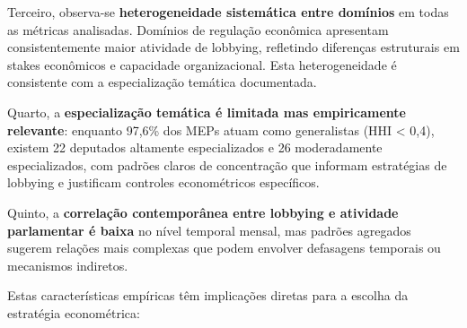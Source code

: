 Terceiro, observa-se \textbf{heterogeneidade sistemática entre domínios} em todas as métricas analisadas. Domínios de regulação econômica apresentam consistentemente maior atividade de lobbying, refletindo diferenças estruturais em stakes econômicos e capacidade organizacional. Esta heterogeneidade é consistente com a especialização temática documentada.

Quarto, a \textbf{especialização temática é limitada mas empiricamente relevante}: enquanto 97,6\% dos MEPs atuam como generalistas (HHI < 0,4), existem 22 deputados altamente especializados e 26 moderadamente especializados, com padrões claros de concentração que informam estratégias de lobbying e justificam controles econométricos específicos.

Quinto, a \textbf{correlação contemporânea entre lobbying e atividade parlamentar é baixa} no nível temporal mensal, mas padrões agregados sugerem relações mais complexas que podem envolver defasagens temporais ou mecanismos indiretos.


Estas características empíricas têm implicações diretas para a escolha da estratégia econométrica:

